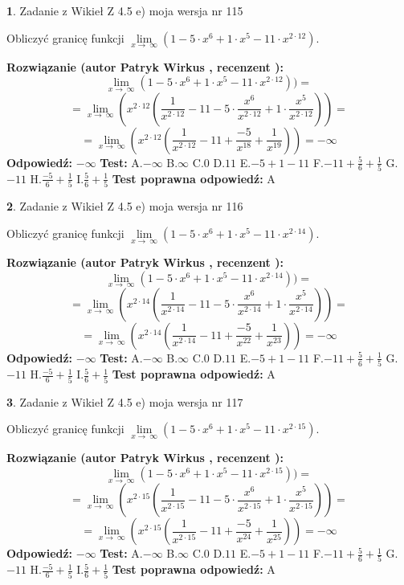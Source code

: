 \documentclass[12pt, a4paper]{article}
\theoremstyle{definition} %
\newtheorem{zad}{}
\newcommand{\zadStart}[1]{\begin{zad}#1\newline}
\newcommand{\zadStop}{\end{zad}}
\newcommand{\rozwStart}[2]{\noindent \textbf{Rozwiązanie (autor #1 , recenzent #2): }\newline}
\newcommand{\rozwStop}{\newline}
\newcommand{\odpStart}{\noindent \textbf{Odpowiedź:}\newline}
\newcommand{\odpStop}{\newline}
\newcommand{\testStart}{\noindent \textbf{Test:}\newline}
\newcommand{\testStop}{\newline}
\newcommand{\kluczStart}{\noindent \textbf{Test poprawna odpowiedź:}\newline}
\newcommand{\kluczStop}{\newline}
\begin{document}
\zadStart{Zadanie z Wikieł Z 4.5 e) moja wersja nr 115}



Obliczyć granicę funkcji  $\lim\limits_{x\to\ \infty}(1 - 5 \cdot x^{6}+1 \cdot x^{5}- 11 \cdot x^{2\cdot12})$.
\zadStop
\rozwStart{Patryk Wirkus}{}
$$\lim\limits_{x\to\ \infty}(1 - 5 \cdot x^{6}+1 \cdot x^{5}- 11 \cdot x^{2\cdot12}))=$$
$$=\lim\limits_{x\to\ \infty}(x^{2\cdot12}(\frac{1}{x^{2\cdot12}}-11 -5 \cdot \frac{x^{6}}{x^{2\cdot12}}+1 \cdot \frac{x^{5}}{x^{2\cdot12}}))=$$
$$=\lim\limits_{x\to\ \infty}(x^{2\cdot12}(\frac{1}{x^{2\cdot12}}-11 + \frac{-5}{x^{18}}+ \frac{1}{x^{19}}))=-\infty$$
\rozwStop
\odpStart
$-\infty$
\odpStop
\testStart
A.$-\infty$ B.$\infty$ C.$0$ D.$11$ E.$-5 + 1 - 11$
F.$-11+\frac{5}{6}+\frac{1}{5}$ G.$-11$
H.$\frac{-5}{6}+\frac{1}{5}$
I.$\frac{5}{6}+\frac{1}{5}$
\testStop
\kluczStart
A
\kluczStop



\zadStart{Zadanie z Wikieł Z 4.5 e) moja wersja nr 116}



Obliczyć granicę funkcji  $\lim\limits_{x\to\ \infty}(1 - 5 \cdot x^{6}+1 \cdot x^{5}- 11 \cdot x^{2\cdot14})$.
\zadStop
\rozwStart{Patryk Wirkus}{}
$$\lim\limits_{x\to\ \infty}(1 - 5 \cdot x^{6}+1 \cdot x^{5}- 11 \cdot x^{2\cdot14}))=$$
$$=\lim\limits_{x\to\ \infty}(x^{2\cdot14}(\frac{1}{x^{2\cdot14}}-11 -5 \cdot \frac{x^{6}}{x^{2\cdot14}}+1 \cdot \frac{x^{5}}{x^{2\cdot14}}))=$$
$$=\lim\limits_{x\to\ \infty}(x^{2\cdot14}(\frac{1}{x^{2\cdot14}}-11 + \frac{-5}{x^{22}}+ \frac{1}{x^{23}}))=-\infty$$
\rozwStop
\odpStart
$-\infty$
\odpStop
\testStart
A.$-\infty$ B.$\infty$ C.$0$ D.$11$ E.$-5 + 1 - 11$
F.$-11+\frac{5}{6}+\frac{1}{5}$ G.$-11$
H.$\frac{-5}{6}+\frac{1}{5}$
I.$\frac{5}{6}+\frac{1}{5}$
\testStop
\kluczStart
A
\kluczStop



\zadStart{Zadanie z Wikieł Z 4.5 e) moja wersja nr 117}



Obliczyć granicę funkcji  $\lim\limits_{x\to\ \infty}(1 - 5 \cdot x^{6}+1 \cdot x^{5}- 11 \cdot x^{2\cdot15})$.
\zadStop
\rozwStart{Patryk Wirkus}{}
$$\lim\limits_{x\to\ \infty}(1 - 5 \cdot x^{6}+1 \cdot x^{5}- 11 \cdot x^{2\cdot15}))=$$
$$=\lim\limits_{x\to\ \infty}(x^{2\cdot15}(\frac{1}{x^{2\cdot15}}-11 -5 \cdot \frac{x^{6}}{x^{2\cdot15}}+1 \cdot \frac{x^{5}}{x^{2\cdot15}}))=$$
$$=\lim\limits_{x\to\ \infty}(x^{2\cdot15}(\frac{1}{x^{2\cdot15}}-11 + \frac{-5}{x^{24}}+ \frac{1}{x^{25}}))=-\infty$$
\rozwStop
\odpStart
$-\infty$
\odpStop
\testStart
A.$-\infty$ B.$\infty$ C.$0$ D.$11$ E.$-5 + 1 - 11$
F.$-11+\frac{5}{6}+\frac{1}{5}$ G.$-11$
H.$\frac{-5}{6}+\frac{1}{5}$
I.$\frac{5}{6}+\frac{1}{5}$
\testStop
\kluczStart
A
\kluczStop
\end{document}
